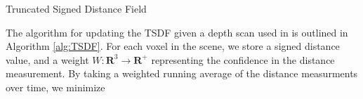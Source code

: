 \documentclass[10pt,twocolumn,letterpaper]{article}
\begin{document}
% 
% 
% 

\begin{algorithm}[t!]
	\caption{Truncated Signed Distance Field}
	\label{alg:TSDF}
	\begin{algorithmic}[1]
		 
			 
				 
				\label{alg:line:dynamic_tsdf}
			     
				    	\label{alg:line:voxel_carve}
					\EndIf
			    \EndFor
				 		 
					\label{alg:line:tsdf_update}
				\EndFor
			\EndFor
		\EndFor
	\end{algorithmic}
\end{algorithm}

The algorithm for updating the TSDF given a depth scan used in
\cite{Curless1996, Newcombe, Whelan2013, Bylow2013} is outlined in Algorithm
\ref{alg:TSDF}. For each voxel in the scene, we store a signed distance value,
and a weight $W : \mathbf{R}^3 \to \mathbf{R^{+}}$ representing the confidence
in the distance measurement. By taking a weighted running average of the
distance measurments over time, we minimize 
\end{document}
